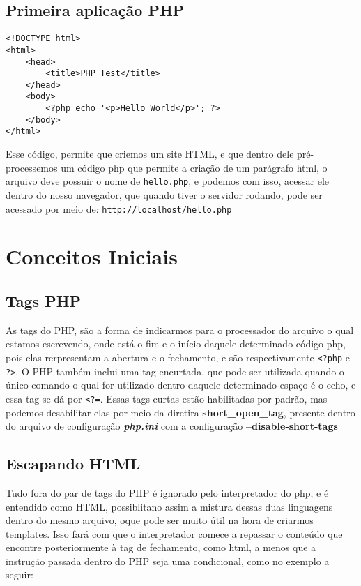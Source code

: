 \documentclass[12pt a4paper]{paper}
\begin{document}
\subsection{Primeira aplicação PHP}

\begin{verbatim}
<!DOCTYPE html>
<html>
    <head>
        <title>PHP Test</title>
    </head>
    <body>
        <?php echo '<p>Hello World</p>'; ?>
    </body>
</html>
\end{verbatim}

Esse código, permite que criemos um site HTML, e que dentro dele pré-processemos um código php que permite a criação de 
um parágrafo html, o arquivo deve possuir o nome de \texttt{hello.php}, e podemos com isso, acessar ele dentro do nosso 
navegador, que quando tiver o servidor rodando, pode ser acessado por meio de: \texttt{http://localhost/hello.php}



\section{Conceitos Iniciais}

\subsection{Tags PHP}
As tags do PHP, são a forma de indicarmos para o processador do arquivo o qual estamos escrevendo, onde está o fim e o 
início daquele determinado código php, pois elas rerpresentam a abertura e o fechamento, e são respectivamente
\texttt{<?php} e \texttt{?>}. O PHP também inclui uma tag encurtada, que pode ser utilizada quando o único comando o 
qual for utilizado dentro daquele determinado espaço é o echo, e essa tag se dá por \texttt{<?=}. Essas tags curtas estão habilitadas por padrão, mas podemos desabilitar elas por meio da diretira \textbf{short\_open\_tag}, presente dentro 
do arquivo de configuração \textbf{\textit{php.ini}} com a configuração \textbf{--disable-short-tags}

\subsection{Escapando HTML}
Tudo fora do par de tags do PHP é ignorado pelo interpretador do php, e é entendido como HTML, possiblitano assim a 
mistura dessas duas linguagens dentro do mesmo arquivo, oque pode ser muito útil na hora de criarmos templates. Isso fará
com que o interpretador comece a repassar o conteúdo que encontre posteriormente à tag de fechamento, como html, a menos 
que a instrução passada dentro do PHP seja uma condicional, como no exemplo a seguir:
\end{document}
